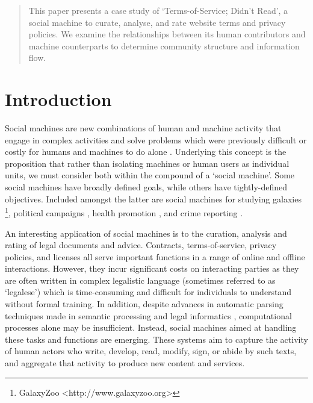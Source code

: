 \documentclass{sig-alternate}
\begin{document}
\maketitle
\begin{abstract}

This paper presents a case study of `Terms-of-Service; Didn't Read', a social machine to curate, analyse, and rate website terms and privacy policies. We examine the relationships between its human contributors and machine counterparts to determine community structure and information flow.

\end{abstract}




\section{Introduction}

Social machines are new combinations of human and machine activity that engage in complex activities and solve problems which were previously difficult or costly for humans and machines to do alone \cite{shadbolt:classif}. Underlying this concept is the proposition that rather than isolating machines or human users as individual units, we must consider both within the compound of a `social machine'. Some social machines have broadly defined goals, while others have tightly-defined objectives. Included amongst the latter are social machines for studying galaxies \footnote{GalaxyZoo <http://www.galaxyzoo.org>}, political campaigns \cite{ohara:politics}, health promotion \cite{kleek:health}, and crime reporting \cite{evans:crime}.

An interesting application of social machines is to the curation, analysis and rating of legal documents and advice. Contracts, terms-of-service, privacy policies, and licenses all serve important functions in a range of online and offline interactions. However, they incur significant costs on interacting parties as they are often written in complex legalistic language (sometimes referred to as `legalese') which is time-consuming and difficult for individuals to understand without formal training. In addition, despite advances in automatic parsing techniques made in semantic processing and legal informatics \cite{franc:semantic, spinosa:nlp}, computational processes alone may be insufficient. Instead, social machines aimed at handling these tasks and functions are emerging. These systems aim to capture the activity of human actors who write, develop, read, modify, sign, or abide by such texts, and aggregate that activity to produce new content and services.
\end{document}
